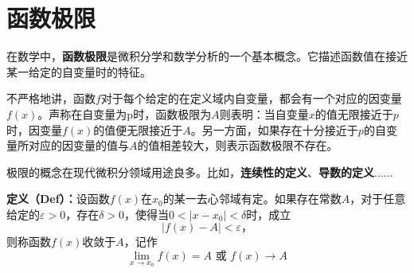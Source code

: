 \documentclass[UTF8]{ctexart}
\begin{document}

\section{函数极限}

在数学中，\textbf{函数极限}是微积分学和数学分析的一个基本概念。它描述函数值在接近某一给定的自变量时的特征。

不严格地讲，函数$f$对于每个给定的在定义域内自变量，都会有一个对应的因变量$f(x)$。声称在自变量为p时，函数极限为$A$则表明：当自变量$x$的值无限接近于$p$时，因变量$f(x)$的值便无限接近于$A$。另一方面，如果存在十分接近于$p$的自变量所对应的因变量的值与$A$的值相差较大，则表示函数极限不存在。

极限的概念在现代微积分领域用途良多。比如，\textbf{连续性的定义}、\textbf{导数的定义}......
\begin{question}
\textbf{定义（Def）：}设函数$f(x)$在$x_0$的某一去心邻域有定。如果存在常数$A$，对于任意给定的$\varepsilon > 0$，存在$\delta > 0$，使得当$0 < |x-x_0| < \delta$时，成立
\begin{equation}
  |f(x)-A| < \varepsilon \text{，}
\end{equation}
则称函数$f(x)$收敛于$A$，记作
\begin{equation}
  \lim_{x \to x_0} f(x) = A \text{ 或 \ }f(x) \to A
\end{equation}
\end{question}
\end{document}
